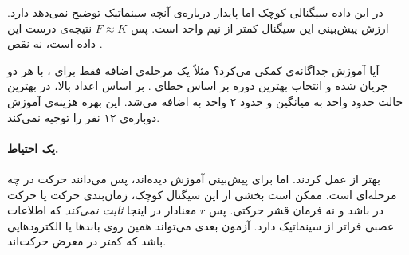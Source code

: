  در این داده سیگنالی کوچک اما پایدار درباره‌ی آنچه سینماتیک توضیح نمی‌دهد دارد. ارزش پیش‌بینی این سیگنال کمتر از نیم واحد  است. پس $F\approx K$ نتیجه‌ی درست این داده است، نه نقص .

آیا آموزش جداگانه‌ی  کمکی می‌کرد؟ مثلاً یک مرحله‌ی اضافه فقط برای ، با هر دو جریان ‌شده و انتخاب بهترین دوره بر اساس خطای . بر اساس اعداد بالا، در بهترین حالت حدود  واحد به میانگین و حدود ۲ واحد به  اضافه می‌شد. این بهره هزینه‌ی آموزش دوباره‌ی ۱۲ نفر را توجیه نمی‌کند.

\paragraph{یک احتیاط.}  بهتر از  عمل کردند. اما  برای پیش‌بینی  آموزش دیده‌اند، پس می‌دانند حرکت در چه مرحله‌ای است. ممکن است بخشی از این سیگنال کوچک، زمان‌بندی حرکت یا  حرکت در  باشد و نه فرمان قشر حرکتی. پس $r$ معنادار در اینجا \emph{ثابت نمی‌کند} که  اطلاعات عصبی فراتر از سینماتیک دارد. آزمون بعدی می‌تواند همین  روی باندها یا الکترودهایی باشد که کمتر در معرض  حرکت‌اند.
